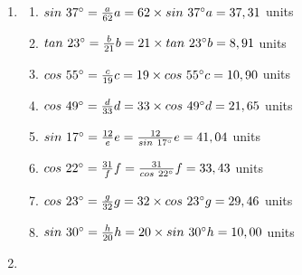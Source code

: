  \begin{solutions}{}{
\begin{enumerate}[itemsep=5pt, label=\textbf{\arabic*}. ] 


\item 
\begin{multicols}{2}
      \begin{enumerate}[noitemsep, label=\textbf{(\alph*)} ]
      
\item $sin~37^{\circ} = \frac{a}{62}\\ a = 62 \times sin~ 37^{\circ} \\ a=37,31$ units
\item $tan~23^{\circ} = \frac{b}{21}\\ b = 21 \times tan~23^{\circ} \\b=8,91$ units
\item $cos~55^{\circ}  = \frac{c}{19}\\ c = 19 \times cos~55^{\circ} \\c=10,90$ units
\item $cos~49^{\circ} =\frac{d}{33} \\ d = 33 \times cos~49^{\circ} \\d=21,65$ units
\item $sin~17^{\circ} = \frac{12}{e}\\ e = \frac{12}{sin~17^{\circ} } \\e=41,04$ units
\item $cos ~22^{\circ}  = \frac{31}{f}\\ f = \frac{31}{cos~22^{\circ} }\\f=33,43$ units
\item $cos~ 23^{\circ}=\frac{g}{32}\\ g = 32 \times cos~23^{\circ} \\ g=29,46$ units
\item $sin~30^{\circ}  = \frac{h}{20}\\ h = 20 \times sin~30^{\circ} \\h=10,00$ units
      \end{enumerate}
\end{multicols}
\item 


\end{enumerate}}
\end{solutions}
